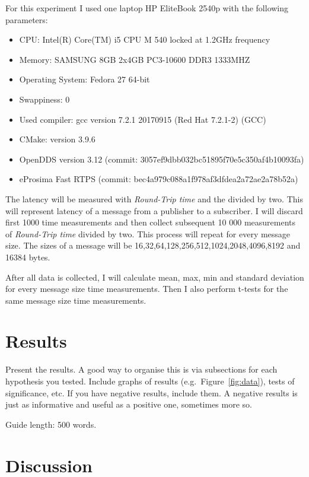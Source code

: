 \documentclass{csfourzero}
\begin{document}
For this experiment I used one laptop HP EliteBook 2540p with the following parameters: 

\begin{itemize}
	\item CPU: Intel(R) Core(TM) i5 CPU M 540 locked at 1.2GHz frequency
	\item Memory: SAMSUNG 8GB 2x4GB PC3-10600 DDR3 1333MHZ
	\item Operating System: Fedora 27 64-bit
	\item Swappiness: 0
	\item Used compiler: gcc version 7.2.1 20170915 (Red Hat 7.2.1-2) (GCC)
	\item CMake: version 3.9.6
	\item OpenDDS version 3.12 (commit: 3057ef9dbb032bc51895f70e5c350af4b10093fa) 
	\item eProsima Fast RTPS (commit: bec4a979c088a1f978af3dfdea2a72ae2a78b52a)
\end{itemize}

The latency will be measured with \textit{Round-Trip time} and the divided by two. This will represent latency of a message from a publisher to a subscriber. I will discard first 1000 time measurements and then collect subsequent 10 000 measurements of \textit{Round-Trip time} divided by two. This process will repeat for every message size. The sizes of a message will be 16,32,64,128,256,512,1024,2048,4096,8192 and 16384 bytes. 

After all data is collected, I will calculate mean, max, min and standard deviation for every message size time measurements. Then I also perform t-tests for the same message size time measurements.

\section{Results}
\label{sec:results}

Present the results. A good way to organise this is via subsections
for each hypothesis you tested. Include graphs of results
(e.g.\ Figure~\ref{fig:data}), tests of significance, etc. If you have
negative results, include them. A negative results is just as
informative and useful as a positive one, sometimes more so.

Guide length: 500 words.

\section{Discussion}
\label{sec:discuss}
\end{document}

